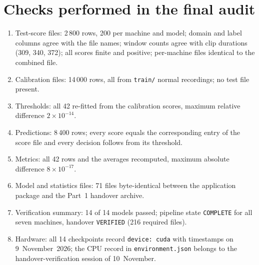 \section{Checks performed in the final audit}
\begin{enumerate}
  \item Test-score files: 2\,800 rows, 200 per machine and model; domain and label columns agree with the file names; window counts agree with clip durations (309, 340, 372); all scores finite and positive; per-machine files identical to the combined file.
  \item Calibration files: 14\,000 rows, all from \texttt{train/} normal recordings; no test file present.
  \item Thresholds: all 42 re-fitted from the calibration scores, maximum relative difference $2\times10^{-14}$.
  \item Predictions: 8\,400 rows; every score equals the corresponding entry of the score file and every decision follows from its threshold.
  \item Metrics: all 42 rows and the averages recomputed, maximum absolute difference $8\times10^{-17}$.
  \item Model and statistics files: 71 files byte-identical between the application package and the Part~1 handover archive.
  \item Verification summary: 14 of 14 models passed; pipeline state \texttt{COMPLETE} for all seven machines, handover \texttt{VERIFIED} (216 required files).
  \item Hardware: all 14 checkpoints record \texttt{device: cuda} with timestamps on 9~November~2026; the CPU record in \texttt{environment.json} belongs to the handover-verification session of 10~November.
\end{enumerate}

